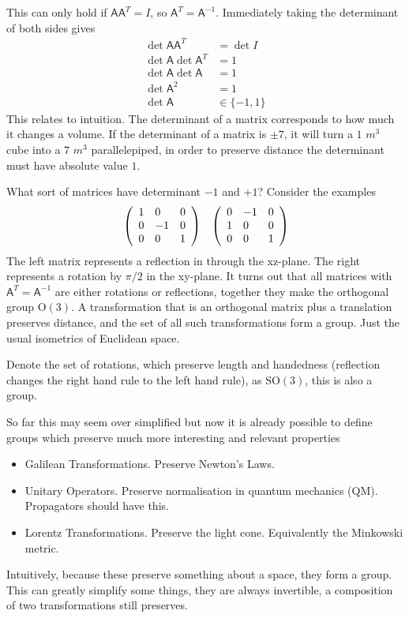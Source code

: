 This can only hold if $\mathsf{A}\mathsf{A}^T=I$, so $\mathsf{A}^T = \mathsf{A}^{-1}$. Immediately taking the determinant of both sides gives
\begin{align*}
\det \mathsf{A}\mathsf{A}^T &= \det I \\
\det \mathsf{A} \det \mathsf{A}^T &= 1 \\
\det \mathsf{A} \det \mathsf{A} &= 1 \\
\det \mathsf{A}^2 &= 1 \\
\det \mathsf{A} &\in \{-1,1\}
\end{align*}
This relates to intuition. The determinant of a matrix corresponds to how much it changes a volume. If the determinant of a matrix is $\pm 7$, it will turn a $1$ $m^3$ cube into a $7$ $m^3$ parallelepiped, in order to preserve distance the determinant must have absolute value $1$.

What sort of matrices have determinant $-1$ and $+1$? Consider the examples
\begin{align*}
&\left( \begin{array}{l l l}
1 &0&0 \\
0&-1&0 \\
0&0&1
\end{array} \right) & \left( \begin{array}{l l l}
0&-1&0 \\
1&0&0 \\
0&0&1
\end{array} \right)
\end{align*}
The left matrix represents a reflection in through the xz-plane. The right represents a rotation by $\pi/2$ in the xy-plane. It turns out that all matrices with $\mathsf{A}^T = \mathsf{A}^{-1}$ are either rotations or reflections, together they make the orthogonal group $\mathrm{O}(3)$. A transformation that is an orthogonal matrix plus a translation preserves distance, and the set of all such transformations form a group. Just the usual isometrics of Euclidean space.

Denote the set of rotations, which preserve length and handedness (reflection changes the right hand rule to the left hand rule), as $\mathrm{SO}(3)$, this is also a group.

So far this may seem over simplified but now it is already possible to define groups which preserve much more interesting and relevant properties
\begin{itemize}
\item Galilean Transformations. Preserve Newton's Laws.
\item Unitary Operators. Preserve normalisation in quantum mechanics (QM). Propagators should have this.
\item Lorentz Transformations. Preserve the light cone. Equivalently the Minkowski metric.
\end{itemize}
Intuitively, because these preserve something about a space, they form a group. This can greatly simplify some things, they are always invertible, a composition of two transformations still preserves.

